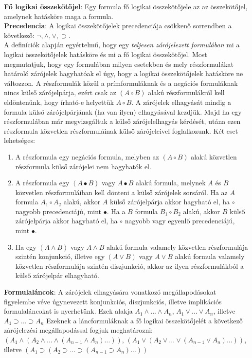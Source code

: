 \documentclass[margin=0px]{article}
\begin{document}
\noindent \textbf{Fő logikai összekötőjel}: Egy formula fő logikai összekötőjele az az összekötőjel, amelynek
hatásköre maga a formula.\\

\noindent \textbf{Precedencia}: A logikai összekötőjelek precedenciája csökkenő sorrendben a következő: $\neg, \wedge, \vee, \supset$.\\

A definíciók alapján egyértelmű, hogy egy \textit{teljesen zárójelezett formulában} mi a logikai összekötőjelek hatásköre és mi a fő
logikai összekötőjel. Most megmutatjuk, hogy egy formulában milyen esetekben és mely részformulákat határoló zárójelek hagyhatóak el úgy, hogy a logikai összekötőjelek hatásköre ne változzon. A részformulák közül a prímformuláknak és a negációs formuláknak nincs külső zárójelpárja, ezért csak az $(A \circ B)$ alakú részformulákról kell eldöntenünk, hogy írható-e helyettük $A \circ B$. A zárójelek elhagyását
mindig a formula külső zárójelpárjának (ha van ilyen) elhagyásával kezdjük. Majd ha egy részformulában már megvizsgáltuk a külső zárójelelhagyás kérdését, utána ezen részformula közvetlen részformuláinak külső zárójeleivel foglalkozunk. Két eset lehetséges:

\begin{enumerate}
    \item	A részformula egy negációs formula, melyben az $(A \circ B)$ alakú közvetlen részformula külső zárójelei nem hagyhatók el.

    \item	A részformula egy $(A \bullet B)$ vagy $A \bullet B$ alakú formula, melynek $A$ és $B$ közvetlen részformuláiban kell dönteni a külső zárójelek sorsáról. Ha az $A$ formula $A_{1} \circ A_{2}$ alakú, akkor $A$ külső zárójelpárja akkor hagyható el, ha $\circ$ nagyobb precedenciájú, mint $\bullet$. Ha a $B$ formula $B_{1} \circ B_{2}$ alakú, akkor $B$ külső zárójelpárja akkor hagyható el, ha $\circ$ nagyobb vagy egyenlő precedenciájú, mint $\bullet$.

    \item	Ha egy $(A \wedge B)$ vagy $A \wedge B$ alakú formula valamely közvetlen részformulája szintén konjunkció, illetve egy
          $(A \vee B)$ vagy $A \vee B$ alakú formula valamely közvetlen részformulája szintén diszjunkció, akkor az ilyen részformulákból a külső zárójelpár elhagyható.
\end{enumerate}

\noindent \textbf{Formulaláncok}: A zárójelek elhagyására vonatkozó megállapodásokat figyelembe véve úgynevezett konjunkciós, diszjunkciós, illetve implikációs formulaláncokat is nyerhetünk. Ezek alakja $A_{1} \wedge ... \wedge A_{n}$, $A_{1} \vee ... \vee A_{n}$, illetve
$A_{1} \supset ... \supset A_{n}$ Ezeknek a láncformuláknak a fő logikai összekötőjelét a következő zárójelezési megállapodással fogjuk meghatározni: $(A_{1} \wedge (A_{2} \wedge ... \wedge (A_{n-1} \wedge A_{n})...))$, $(A_{1} \vee (A_{2} \vee ... \vee (A_{n-1} \vee A_{n})...))$, illetve $(A_{1} \supset (A_{2} \supset ... \supset (A_{n-1} \supset A_{n})...))$
\end{document}
